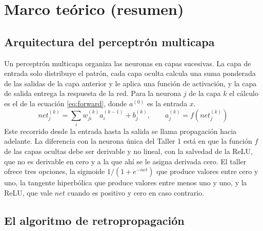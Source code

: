 \documentclass[11pt,letterpaper]{article}
\begin{document}
\section{Marco teórico (resumen)}

\subsection{Arquitectura del perceptrón multicapa}

Un perceptrón multicapa organiza las neuronas en capas sucesivas. La capa de entrada solo distribuye el patrón, cada capa oculta calcula una suma ponderada de las salidas de la capa anterior y le aplica una función de activación, y la capa de salida entrega la respuesta de la red. Para la neurona $j$ de la capa $k$ el cálculo es el de la ecuación \eqref{eq:forward}, donde $a^{(0)}$ es la entrada $x$.
\begin{equation}
    net_j^{(k)} = \sum_i w_{ji}^{(k)} a_i^{(k-1)} + b_j^{(k)}, \qquad a_j^{(k)} = f\left(net_j^{(k)}\right)
    \label{eq:forward}
\end{equation}
Este recorrido desde la entrada hasta la salida se llama propagación hacia adelante. La diferencia con la neurona única del Taller 1 está en que la función $f$ de las capas ocultas debe ser derivable y no lineal, con la salvedad de la ReLU, que no es derivable en cero y a la que ahí se le asigna derivada cero. El taller ofrece tres opciones, la sigmoide $1/(1+e^{-net})$ que produce valores entre cero y uno, la tangente hiperbólica que produce valores entre menos uno y uno, y la ReLU, que vale $net$ cuando es positivo y cero en caso contrario.

\subsection{El algoritmo de retropropagación}
\label{sec:backprop}
\end{document}

